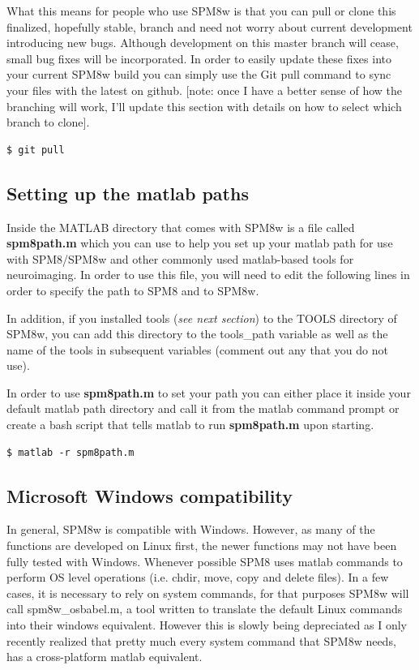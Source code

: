\documentclass[12pt]{article}
\begin{document}
What this means for people who use SPM8w is that you can pull or clone this finalized, hopefully stable, branch and need not worry about current development introducing new bugs. Although development on this master branch will cease, small bug fixes will be incorporated. In order to easily update these fixes into your current SPM8w build you can simply use the Git pull command to sync your files with the latest on github. [note: once I have a better sense of how the branching will work, I'll update this section with details on how to select which branch to clone]. 
  
\begin{lstlisting}
$ git pull
\end{lstlisting} 

\subsection{Setting up the matlab paths}
Inside the MATLAB directory that comes with SPM8w is a file called \textbf{spm8path.m}  which you can use to help you set up your matlab path for use with SPM8/SPM8w and other commonly used matlab-based tools for neuroimaging. In order to use this file, you will need to edit the following lines in order to specify the path to SPM8 and to SPM8w. 



In addition, if you installed tools (\emph{see next section}) to the TOOLS directory of SPM8w, you can add this directory to the tools\_path variable as well as the name of the tools in subsequent variables (comment out any that you do not use). 



In order to use \textbf{spm8path.m} to set your path you can either place it inside your default matlab path directory and call it from the matlab command prompt or create a bash script that tells matlab to run \textbf{spm8path.m} upon starting.
\begin{lstlisting}
$ matlab -r spm8path.m
\end{lstlisting}

\subsection{Microsoft Windows compatibility}
In general, SPM8w is compatible with Windows. However, as many of the functions are developed on Linux first, the newer functions may not have been fully tested with Windows. Whenever possible SPM8 uses matlab commands to perform OS level operations (i.e. chdir, move, copy and delete files). In a few cases, it is necessary to rely on system commands, for that purposes SPM8w will call spm8w\_osbabel.m, a tool written to translate the default Linux commands into their windows equivalent. However this is slowly being depreciated as I only recently realized that pretty much every system command that SPM8w needs, has a cross-platform matlab equivalent. 
\end{document}
